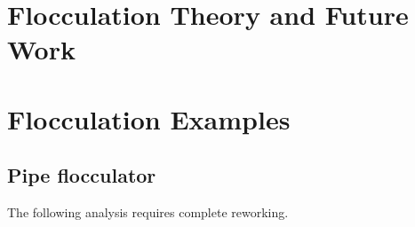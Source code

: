\documentclass[letterpaper,10pt,english]{sphinxmanual}
\begin{document}
\chapter{Flocculation Theory and Future Work}
\label{\detokenize{Flocculation/Floc_Theory_and_Future_Work:flocculation-theory-and-future-work}}\label{\detokenize{Flocculation/Floc_Theory_and_Future_Work:title-flocculation-theory-and-future-work}}\label{\detokenize{Flocculation/Floc_Theory_and_Future_Work::doc}}

\chapter{Flocculation Examples}
\label{\detokenize{Flocculation/Floc_Examples:flocculation-examples}}\label{\detokenize{Flocculation/Floc_Examples:title-flocculation-examples}}\label{\detokenize{Flocculation/Floc_Examples::doc}}

\section{Pipe flocculator}
\label{\detokenize{Flocculation/Floc_Examples:pipe-flocculator}}
The following analysis requires complete reworking.
\end{document}
